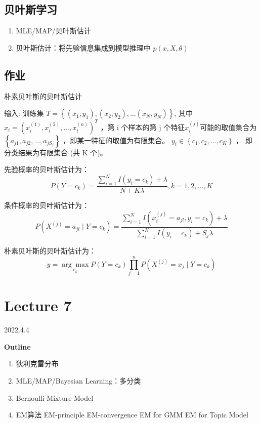 \documentclass[UTF8]{ctexart}
\numberwithin{equation}{section}
\begin{document}
\subsection{贝叶斯学习}
\begin{enumerate}
    \item MLE/MAP/贝叶斯估计
    \item 贝叶斯估计：将先验信息集成到模型推理中 $p(x,X,\theta)$
\end{enumerate}

\subsection*{\textbf{作业} }
朴素贝叶斯的贝叶斯估计

输入: 训练集 $T=\left\{\left(x_{1}, y_{1}\right),\left(x_{2}, y_{2}\right), \ldots\left(x_{N}, y_{N}\right)\right\}$, 其中 $x_{i}=\left(x_{i}^{(1)}, x_{i}^{(2)}, \ldots, x_{i}^{(n)}\right)^{T}$ ，第 $\mathrm{i}$ 个样本的第 $\mathrm{j}$ 个特征$x_{i}^{(j)}$可能的取值集合为 $\left\{a_{j 1}, a_{j 2}, \ldots, a_{j S_{j}}\right\}$ ，即某一特征的取值为有限集合。
$y_{i} \in\left\{c_{1}, c_{2}, \ldots, c_{K}\right\}$ ， 即分类结果为有限集合 (共 $\mathrm{K}$ 个)。

先验概率的贝叶斯估计为：
$$
P\left(Y=c_{k}\right)=\frac{\sum_{i=1}^{N} I\left(y_{i}=c_{k}\right)+\lambda}{N+K\lambda}, k=1,2, \ldots, K
$$

条件概率的贝叶斯估计为：
$$
P\left(X^{(j)}=a_{j l} \mid Y=c_{k}\right)=\frac{\sum_{i=1}^{N} I\left(x_{i}^{(j)}=a_{j l}, y_{i}=c_{k}\right)+\lambda}{\sum_{i=1}^{N} I\left(y_{i}=c_{k}\right)+S_j\lambda}
$$

朴素贝叶斯的贝叶斯估计为：
$$
y=\underset{c_k}{\arg \max}P(Y=c_{k})\prod_{j=1}^nP(X^{(j)}=x_{j }\mid  Y=c_{k})
$$

\newpage
\section{Lecture 7}
2022.4.4

\textbf{Outline}
\begin{enumerate}
    \item 狄利克雷分布
    \item MLE/MAP/Bayesian Learning：多分类
    \item Bernoulli Mixture Model
    \item EM算法
        \subitem EM-principle
        \subitem EM-convergence
        \subitem EM for GMM
        \subitem EM for Topic Model
\end{enumerate}
\end{document}
